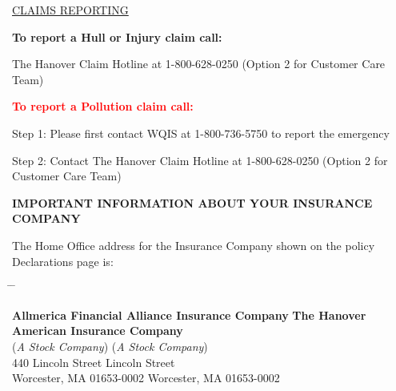 \documentclass[10pt]{article}
\begin{document}
\hfill

\begin{center}
{\large \underline{CLAIMS REPORTING}}
\end{center}

\large {\textbf{To report a Hull or Injury claim call:}}

\hfill

The Hanover Claim Hotline at 1-800-628-0250 (Option 2 for Customer Care Team)

\hfill

\textcolor{red}{\textbf{To report a Pollution claim call:}} %

\hfill

Step 1: Please first contact WQIS at 1-800-736-5750 to report the emergency

\hfill

Step 2: Contact The Hanover Claim Hotline at 1-800-628-0250 (Option 2 for Customer Care Team)
\extramarks{}{}



\newpage
 \extramarks{}{} 
\begin{center} \textbf{\Large{IMPORTANT INFORMATION ABOUT YOUR INSURANCE COMPANY}} \end{center}

\hfill \break

{The Home Office address for the Insurance Company shown on the policy Declarations page is: }

\hfill \break

\begin{tabbing}

    \hspace{1in} \= \hspace{3in} \= \kill

    \textbf{Allmerica Financial Alliance Insurance Company} \> \> \textbf{The Hanover American Insurance Company} \\

    (\textit{A Stock Company}) \> \> (\textit{A Stock Company}) \\

    440 Lincoln Street \>  Lincoln Street \\

    Worcester, MA 01653-0002 \> \> Worcester, MA 01653-0002 \\

\end{tabbing}
\end{document}

